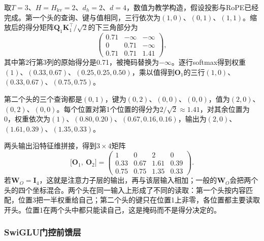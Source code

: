 \begin{example}[两头因果注意力的手算]
  \label{ex:nlp-llm-two-head-attention}
  取$T=3$、$H=H_{\mathrm{kv}}=2$、$d_h=2$、$d=4$，数值为教学构造，假设投影与RoPE已经完成。第一个头的查询、键与值相同，三行依次为$(1,0)$、$(0,1)$、$(1,1)$。缩放后的得分矩阵$\bm Q_1\bm K_1^{\top}/\sqrt2$的下三角部分为
  \[
    \begin{pmatrix}
      0.71&-\infty&-\infty\\
      0&0.71&-\infty\\
      0.71&0.71&1.41
    \end{pmatrix},
  \]
  其中第2行第3列的原始得分是0.71，被掩码替换为$-\infty$。逐行softmax得到权重$(1)$、$(0.33,0.67)$、$(0.25,0.25,0.50)$，乘以值得到$\bm O_1$的三行$(1,0)$、$(0.33,0.67)$、$(0.75,0.75)$。

  第二个头的三个查询都是$(0,1)$，键为$(0,2)$、$(0,0)$、$(0,0)$，值为$(2,0)$、$(0,2)$、$(0,0)$。每个位置对第1个位置的得分为$2/\sqrt2\approx1.41$，对其余位置为0，权重依次为$(1)$、$(0.80,0.20)$、$(0.67,0.16,0.16)$，输出为$(2,0)$、$(1.61,0.39)$、$(1.35,0.33)$。

  两头输出沿特征维拼接，得到$3\times4$矩阵
  \[
    \bigl[\bm O_1,\ \bm O_2\bigr]=
    \begin{pmatrix}
      1&0&2&0\\
      0.33&0.67&1.61&0.39\\
      0.75&0.75&1.35&0.33
    \end{pmatrix}.
  \]
  若$\bm W_O=\bm I_4$，这就是注意力子层的输出，再与该层输入相加；一般的$\bm W_O$会把两个头的四个坐标混合。两个头在同一输入上形成了不同的读取：第一个头按内容匹配，位置3把一半权重给自己；第二个头的键只在位置1上非零，各位置都主要读取开头。位置1在两个头中都只能读自己，这是掩码而不是得分决定的。
\end{example}

\subsubsection{SwiGLU门控前馈层}
\label{sec:nlp-llm-swiglu}

